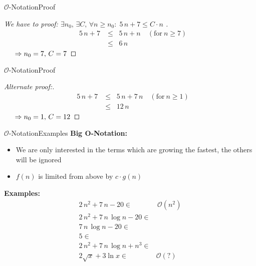 
\begin{frame}{$\mathcal{O}$-Notation}{Proof}
  \begin{proof}[
    We have to proof:
    \begin{math}
      \exists n_0, \, \exists C, \, \forall n \geq n_0 \! : \;
        5 \, n + 7 \leq C \cdot n
    \end{math}
  ]
    \begin{eqnarray*}
      &5 \, n + 7 &\leq \;\; 5 \, n + n \hspace{1em} (\text{for} ~ n \geq 7)\\
      && \leq \;\; 6 \, n
    \end{eqnarray*}
    $\hspace{1.5em} \Rightarrow n_0 = 7, \, C = 7$ \qedhere
  \end{proof}
\end{frame}


\begin{frame}{$\mathcal{O}$-Notation}{Proof}
  \begin{proof}[Alternate proof:]
    \begin{eqnarray*}
      &5 \, n + 7 &\leq \;\; 5 \, n + 7 \, n \hspace{1em}
      (\text{for} ~ n \geq 1)\\
      && \leq \;\; 12 \, n
    \end{eqnarray*}
    $\hspace{1.5em} \Rightarrow n_0 = 1, \, C = 12$ \qedhere
  \end{proof}
\end{frame}


\begin{frame}{$\mathcal{O}$-Notation}{Examples}
  \textbf{Big O-Notation:}
  \begin{itemize}
    \item
      We are only interested in the terms which are growing the fastest,
      the others will be ignored
    \item
      $f(n)$ is limited {\color{Mittel-Blau}from above} by $c \cdot g(n)$
  \end{itemize}
  \textbf{Examples:}
  \begin{align*}
     2 \, n^2 + 7 \, n - 20 \in & \,\mathcal{O}(n^2)\\
     2 \, n^2 + 7 \, n \, \log n - 20 \in & {}\\
     7 \, n \, \log n - 20 \in & {}\\
     5 \in & {}\\
     2 \, n^2 + 7 \, n \, \log n + n^3 \in & {}\\
     2 \sqrt{x} + 3 \ln x \in & \mathcal{O}(?)
  \end{align*}
\end{frame}

